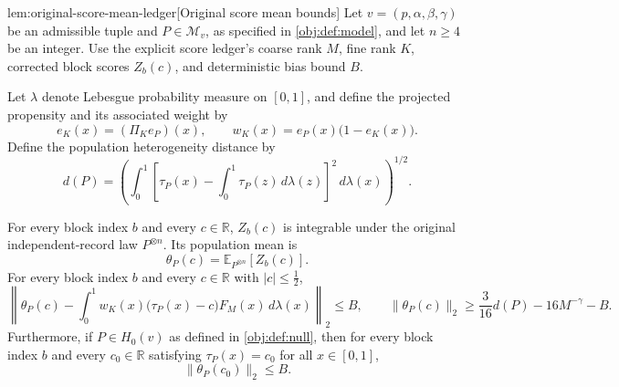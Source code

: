 \documentclass[11pt]{article}
\begin{document}
\begin{lemmav}{lem:original-score-mean-ledger}[Original score mean bounds]
Let \(v=(p,\alpha,\beta,\gamma)\) be an admissible tuple and \(P\in\mathcal M_v\), as specified in \cref{obj:def:model}, and let \(n\ge4\) be an integer. Use the explicit score ledger's coarse rank \(M\), fine rank \(K\), corrected block scores \(Z_b(c)\), and deterministic bias bound \(B\).

Let \(\lambda\) denote Lebesgue probability measure on \([0,1]\), and define the projected propensity and its associated weight by
\[
e_K(x)=(\Pi_K e_P)(x),
\qquad
w_K(x)=e_P(x)\bigl(1-e_K(x)\bigr).
\]
Define the population heterogeneity distance by
\[
d(P)=
\left(
\int_0^1
\left[\tau_P(x)-\int_0^1\tau_P(z)\,d\lambda(z)\right]^2
\,d\lambda(x)
\right)^{1/2}.
\]

For every block index \(b\) and every \(c\in\mathbb R\), \(Z_b(c)\) is integrable under the original independent-record law \(P^{\otimes n}\). Its population mean is
\[
\theta_P(c)
=
\mathbb E_{P^{\otimes n}}\!\left[Z_b(c)\right].
\]
For every block index \(b\) and every \(c\in\mathbb R\) with \(|c|\le\tfrac12\),
\[
\left\|
\theta_P(c)
-
\int_0^1
w_K(x)\bigl(\tau_P(x)-c\bigr)F_M(x)\,d\lambda(x)
\right\|_2
\le B,
\qquad
\|\theta_P(c)\|_2
\ge
\frac{3}{16}d(P)-16M^{-\gamma}-B.
\]
Furthermore, if \(P\in H_0(v)\) as defined in \cref{obj:def:null}, then for every block index \(b\) and every \(c_0\in\mathbb R\) satisfying \(\tau_P(x)=c_0\) for all \(x\in[0,1]\),
\[
\|\theta_P(c_0)\|_2\le B.
\]
\end{lemmav}
\end{document}
